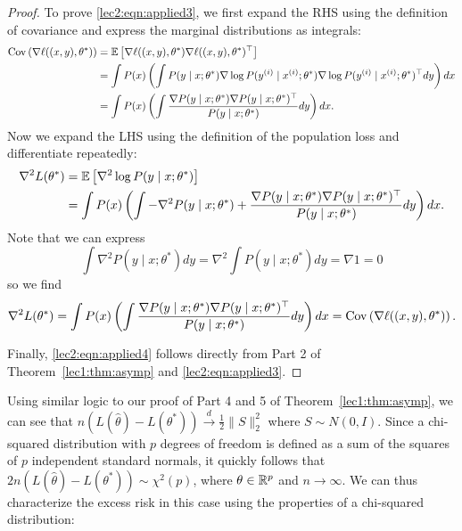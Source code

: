 \begin{proof}
To prove \eqref{lec2:eqn:applied3}, we first expand the RHS using the definition of covariance and express the marginal distributions as integrals:
\begin{align}
    \operatorname{Cov} \left( \nabla \ell ((x, y), \theta^*) \right) &= \mathbb{E} \left[ \nabla \ell ((x, y), \theta^*) \nabla \ell ((x, y), \theta^*)^\top \right] \\
    &= \int P(x) \left( \int P(y \mid x; \theta^*) \nabla \log P( y^{(i)} \mid x^{(i)} ; \theta^*) \nabla \log P( y^{(i)} \mid x^{(i)} ; \theta^*)^\top dy \right) dx \\
    &= \int P(x) \left( \int \frac{\nabla P(y \mid x; \theta^*) \nabla P(y \mid x; \theta^*)^\top}{P(y \mid x; \theta^*)}dy \right) dx.
\end{align}
Now we expand the LHS using the definition of the population loss and differentiate repeatedly:
\begin{align}
    \nabla^2 L(\theta^*) &= \mathbb{E} \left[ \nabla^2 \log P(y \mid x; \theta^*) \right] \\
    &= \int P(x) \left( \int - \nabla^2 P(y \mid x; \theta^*) + \frac{\nabla P(y \mid x; \theta^*) \nabla P(y \mid x; \theta^*)^\top}{P(y \mid x; \theta^*)}dy  \right) dx.
\end{align}
Note that we can express 
\begin{equation} \int \nabla^2 P(y \mid x; \theta^*) dy = \nabla^2 \int P(y \mid x; \theta^*) dy = \nabla 1  = 0 \end{equation}
so we find
\begin{equation} \nabla^2 L(\theta^*) = \int P(x) \left( \int \frac{\nabla P(y \mid x; \theta^*) \nabla P(y \mid x; \theta^*)^\top}{P(y \mid x; \theta^*)}dy \right) dx = \operatorname{Cov} \left( \nabla \ell ((x, y), \theta^*) \right). \end{equation}

Finally, \eqref{lec2:eqn:applied4} follows directly from Part 2 of Theorem~\ref{lec1:thm:asymp} and \eqref{lec2:eqn:applied3}.
\end{proof}

Using similar logic to our proof of Part 4 and 5 of Theorem~\ref{lec1:thm:asymp}, we can see that $n (L(\hat \theta) - L(\theta^*)) \overset d \to \frac12 \|S\|_2^2$ where $S \sim N(0, I)$. Since a chi-squared distribution with $p$ degrees of freedom is defined as a sum of the squares of $p$ independent standard normals, it quickly follows that $2n (L(\hat \theta) - L(\theta^*)) \sim  \chi^2(p)$, where $\theta \in \mathbb R^p$ and $n \to \infty$. We can thus characterize the excess risk in this case using the properties of a chi-squared distribution:

